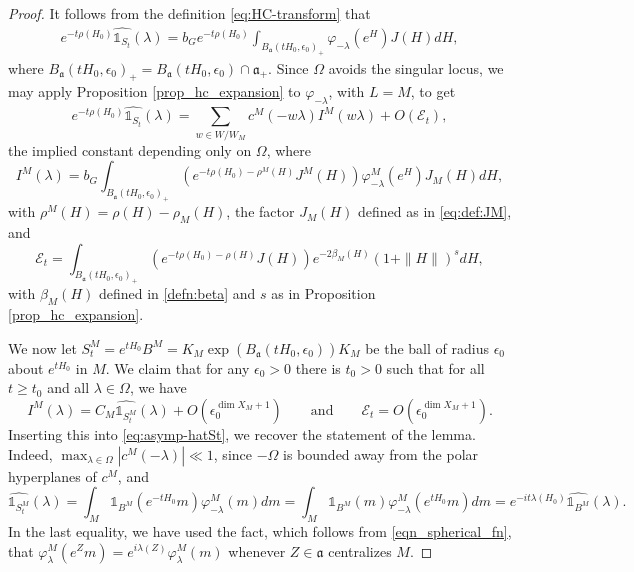\documentclass[12pt]{amsart}
\theoremstyle{remark}
\newcommand{\ga}{\mathfrak a}
\begin{document}
\begin{proof}
It follows from the definition \eqref{eq:HC-transform} that
    \begin{gather*}
e^{-t \rho(H_0)} \widehat{\mathds{1}_{S_t}}(\lambda)= b_G e^{-t \rho(H_0)} \int_{B_\ga(t H_0,\epsilon_0)_+} \varphi_{-\lambda}(e^H) J(H) dH,
    \end{gather*}
where $B_\ga(t H_0,\epsilon_0)_+=B_\ga(t H_0,\epsilon_0)\cap\ga_+$. Since $\Omega$ avoids the singular locus, we may apply Proposition \ref{prop_hc_expansion} to $\varphi_{-\lambda}$, with $L=M$, to get
\begin{equation}\label{eq:asymp-hatSt}
e^{-t \rho(H_0)} \widehat{\mathds{1}_{S_t}}(\lambda)=\sum_{w \in W / W_M} c^M(-w\lambda) I^M(w\lambda) +O(\mathcal{E}_t),
  \end{equation}
 the implied constant depending only on $\Omega$, where
  \[
  I^M(\lambda)= b_G \int_{B_\ga(t H_0,\epsilon_0)_+} \left(e^{-t \rho(H_0)-\rho^M(H)}J^M(H)\right) \varphi_{-\lambda}^M(e^H) J_M(H)dH,
  \]
with $\rho^M(H)=\rho(H)-\rho_M(H)$, the factor $J_M(H)$ defined as in \eqref{eq:def:JM}, and
\[
\mathcal{E}_t= \int_{B_\ga(t H_0,\epsilon_0)_+} \left(e^{-t \rho(H_0)-\rho(H)}J(H)\right)e^{-2\beta_M(H)}(1+\|H\|)^s  dH,
\]
with $\beta_M(H)$ defined in \eqref{defn:beta} and $s$ as in Proposition \ref{prop_hc_expansion}.

We now let $S_t^M=e^{tH_0}B^M=K_M\exp(B_\ga(tH_0,\epsilon_0))K_M$ be the ball of radius $\epsilon_0$ about $e^{t H_0}$ in $M$. We claim that for any $\epsilon_0>0$ there is $t_0>0$ such that for all $t\geq t_0$ and all $\lambda \in \Omega$, we have
\begin{equation}\label{main-and-error}
  I^M(\lambda) = C_M\widehat{\mathds{1}_{S_t^M}}(\lambda)+O(\epsilon_0^{ \dim X_M + 1}) \qquad\textrm{and}\qquad \mathcal{E}_t=O(\epsilon_0^{ \dim X_M + 1}).
\end{equation}
Inserting this into \eqref{eq:asymp-hatSt}, we recover the statement of the lemma. Indeed, $\max_{\lambda\in\Omega}|c^M( -\lambda)|\ll 1$, since $-\Omega$ is bounded away from the polar hyperplanes of $c^M$, and
\[
        \widehat{\mathds{1}_{S_t^M}}(\lambda) =  \int_M \mathds{1}_{B^M}(e^{-tH_0}m)\varphi_{-\lambda}^M(m) dm=\int_M \mathds{1}_{B^M}(m)\varphi_{-\lambda}^M(e^{tH_0}m) dm= e^{-it\lambda(H_0)} \widehat{\mathds{1}_{B^M}}(\lambda).
  \]
In the last equality, we have used the fact, which follows from \eqref{eqn_spherical_fn}, that $\varphi^M_{\lambda}(e^Z m) = e^{i \lambda(Z)} \varphi^M_{\lambda}(m)$ whenever $Z \in \ga$ centralizes $M$. 


\end{proof}
\end{document}
